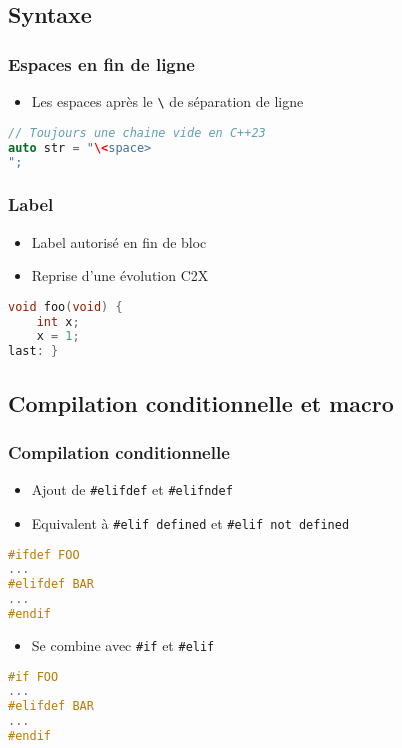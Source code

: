 \documentclass[C++.tex]{subfiles}
\begin{document}
\subsection*{Syntaxe}
\begin{frame}[fragile]
	\frametitle{Espaces en fin de ligne}
	\begin{itemize}
		\item Les espaces après le \lstinline|\| de séparation de ligne
	\end{itemize}

	\begin{lstlisting}[language=C++]
// Toujours une chaine vide en C++23
auto str = "\<space>
";\end{lstlisting}

\end{frame}

\begin{frame}[fragile]
	\frametitle{Label}
	\begin{itemize}
		\item Label autorisé en fin de bloc
		\item Reprise d'une évolution C2X
	\end{itemize}

	\begin{lstlisting}[language=C++]
void foo(void) {
	int x; 
	x = 1;
last: }\end{lstlisting}
\end{frame}

\subsection*{Compilation conditionnelle et macro}
\begin{frame}[fragile]
	\frametitle{Compilation conditionnelle}
	\begin{itemize}
		\item Ajout de \lstinline|#elifdef| et \lstinline|#elifndef|
		\item Equivalent à \lstinline|#elif defined| et \lstinline|#elif not defined|
	\end{itemize}

	\begin{lstlisting}[language=C++]
#ifdef FOO
...
#elifdef BAR
...
#endif\end{lstlisting}

	\begin{itemize}
		\item Se combine avec \lstinline|#if| et \lstinline|#elif|
	\end{itemize}

	\begin{lstlisting}[language=C++]
#if FOO
...
#elifdef BAR
...
#endif\end{lstlisting}
\end{frame}
\end{document}
